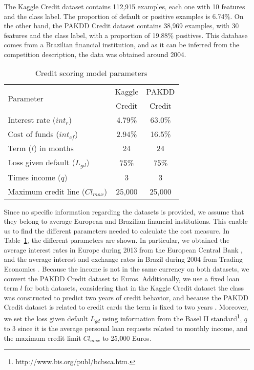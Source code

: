     The Kaggle Credit dataset contains 112,915 examples, each one with 10 features and the class 
    label. The proportion of default or positive examples is 6.74\%. 
    On the other hand, the PAKDD Credit dataset contains 38,969 examples, with 30 features and the 
    class label, with a proportion of 19.88\% positives. This database comes from a Brazilian 
    financial institution, and as it can be inferred from the competition description, the data 
    was obtained around 2004.
   
   
\begin{table}
\centering
\footnotesize
\begin{tabular}{lcc}
\hline
\multirow{ 2}{*}{Parameter}&Kaggle& PAKDD \\
  & Credit& Credit \\
  \hline
  Interest rate ($int_r$) &  4.79\% & 63.0\% \\
  Cost of funds ($int_{cf}$) & 2.94\% & 16.5\% \\
  Term ($l$) in months & 24 & 24 \\
  Loss given default ($L_{gd}$) &75\% & 75\% \\
  Times income ($q$) & 3 & 3 \\
  Maximum credit line ($Cl_{max}$) & 25,000 & 25,000\\
  \hline
\end{tabular}
\caption{Credit scoring model parameters}
\label{tab:4:parameters}
\end{table}

    Since no specific information regarding the datasets is provided, we assume that they belong to 
    average European and Brazilian financial institutions. This enable us to find the different 
    parameters needed to calculate the cost measure. In Table~\ref{tab:4:parameters}, the different 
    parameters are shown. In particular, we obtained the average interest rates in Europe during 
    2013 from the European Central Bank \citep{ECB2014}, and the average interest and exchange 
    rates in Brazil during 2004 from Trading Economics \citep{Economics2014}. Because the income 
    is not in the same currency on both datasets, we convert the PAKDD Credit dataset to Euros.
    Additionally, we use a fixed loan term $l$ for both datasets, considering that in the Kaggle 
    Credit dataset the class was constructed to predict two years of credit behavior, and 
    because the PAKDD Credit dataset is related to credit cards the term is fixed to two years 
    \citep{Lawrence2012}. Moreover, we set the loss given default $L_{gd}$ using information from 
    the Basel II standard\footnote{http://www.bis.org/publ/bcbsca.htm.}, $q$ to 3 since it is the 
    average personal loan requests related to monthly income, and the maximum credit limit 
    $Cl_{max}$ to 25,000 Euros.

